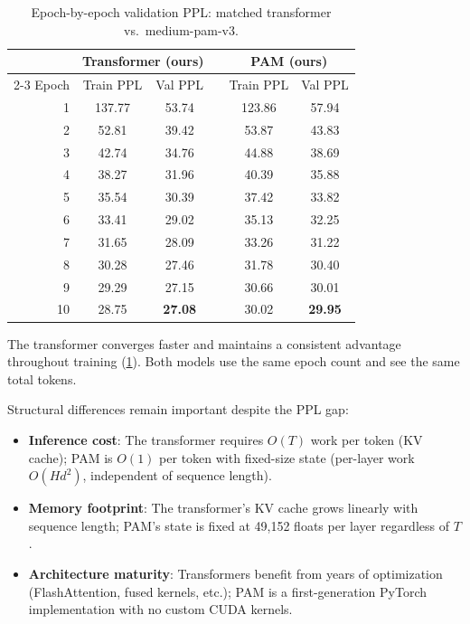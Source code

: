 \documentclass[11pt]{article}
\begin{document}
\begin{table}[t]
  \centering
  \caption{Epoch-by-epoch validation PPL: matched transformer vs.\ medium-pam-v3.}
  \label{tab:epoch-comparison}
  \begin{tabular}{@{}rccccc@{}}
    \toprule
    & \multicolumn{2}{c}{Transformer (ours)} & & \multicolumn{2}{c}{PAM (ours)} \\
    \cmidrule{2-3} \cmidrule{5-6}
    Epoch & Train PPL & Val PPL & & Train PPL & Val PPL \\
    \midrule
    1 & 137.77 & 53.74 & & 123.86 & 57.94 \\
    2 & 52.81 & 39.42 & & 53.87 & 43.83 \\
    3 & 42.74 & 34.76 & & 44.88 & 38.69 \\
    4 & 38.27 & 31.96 & & 40.39 & 35.88 \\
    5 & 35.54 & 30.39 & & 37.42 & 33.82 \\
    6 & 33.41 & 29.02 & & 35.13 & 32.25 \\
    7 & 31.65 & 28.09 & & 33.26 & 31.22 \\
    8 & 30.28 & 27.46 & & 31.78 & 30.40 \\
    9 & 29.29 & 27.15 & & 30.66 & 30.01 \\
    10 & 28.75 & \textbf{27.08} & & 30.02 & \textbf{29.95} \\
    \bottomrule
  \end{tabular}
\end{table}

The transformer converges faster and maintains a consistent advantage throughout training (\cref{tab:epoch-comparison}). Both models use the same epoch count and see the same total tokens.

Structural differences remain important despite the PPL gap:
\begin{itemize}
  \item \textbf{Inference cost}: The transformer requires $O(T)$ work per token (KV cache); PAM is $O(1)$ per token with fixed-size state (per-layer work $O(Hd^2)$, independent of sequence length).
  \item \textbf{Memory footprint}: The transformer's KV cache grows linearly with sequence length; PAM's state is fixed at 49,152 floats per layer regardless of $T$.
  \item \textbf{Architecture maturity}: Transformers benefit from years of optimization (FlashAttention, fused kernels, etc.); PAM is a first-generation PyTorch implementation with no custom CUDA kernels.
\end{itemize}
\end{document}
